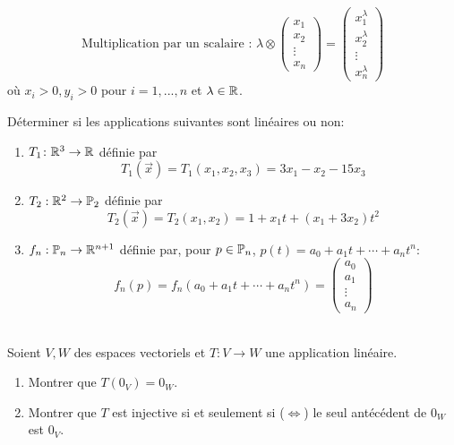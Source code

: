 \begin{exercice}
\begin{enumerate}
        $$\text{Multiplication par un scalaire : } \lambda \otimes \begin{pmatrix}
            x_1 \\ x_2 \\ \vdots \\ x_n
        \end{pmatrix} =
        \begin{pmatrix}
            x_1^{\lambda} \\ x_2^{\lambda} \\ \vdots \\ x_n^{\lambda}
        \end{pmatrix}$$
    où $x_i > 0, y_i > 0$ pour $i = 1, ..., n$ et $\lambda \in \R$. \\
    
\end{enumerate}
\end{exercice}

\begin{exercice}
Déterminer si les applications suivantes sont linéaires ou non:
\begin{enumerate}
    \item $T_1 \colon \R^3 \to \R$ définie par
    \[
        T_1 (\vec{x}) = T_1(x_1, x_2, x_3) = 3x_1 - x_2 - 15x_3
    \]
    \item $T_2: \R^2 \to \P_2$ définie par 
    $$T_2(\vec{x}) = T_2(x_1, x_2) = 1 + x_1 t + (x_1 + 3x_2)t^2$$
    \item $f_n: \P_n \to \R^{n+1}$ définie par, pour $p \in \P_n$, $p(t) = a_0 + a_1 t + \cdots + a_n t^n$: 
    $$f_n(p) = f_n(a_0 + a_1 t + \cdots + a_n t^n) = \begin{pmatrix}
        a_0 \\ a_1 \\ \vdots \\ a_n
    \end{pmatrix}$$ \\
\end{enumerate}
\end{exercice}

\begin{exercice}
    Soient $V, W$ des espaces vectoriels et $T: V \to W$ une application linéaire.
    \begin{enumerate}
        \item Montrer que $T(0_V) = 0_W$.
        \item Montrer que $T$ est injective si et seulement si ($\iff$) le seul antécédent de $0_W$ est $0_V$.
    \end{enumerate}
\end{exercice}